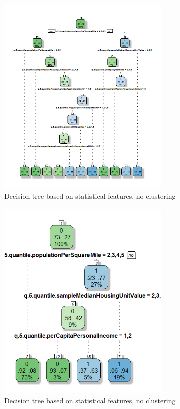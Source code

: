 \documentclass[conference,compsoc]{IEEEtran}
\begin{document}
\begin{figure}[!t]
\centering
\includegraphics[width=3.25in]{decision-tree-02-all-no-clustering.png}
\caption{Decision tree based on statistical features, no clustering}
\label{decision.tree.02}
\end{figure}

\begin{figure}[!t]
\centering
\includegraphics[width=3.25in]{decision-tree-02-cluster-1.png}
\caption{Decision tree based on statistical features, no clustering}
\label{decision.tree.02.1}
\end{figure}
\end{document}
